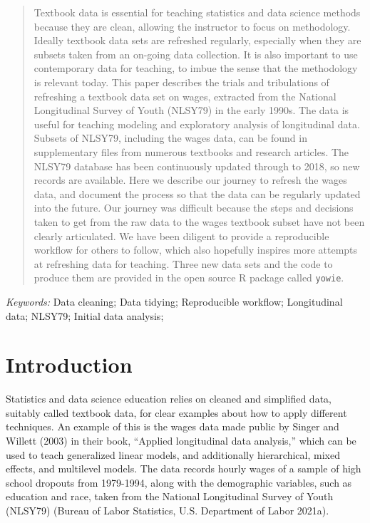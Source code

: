 \documentclass[12pt]{article}
\def\spacingset#1{\renewcommand{\baselinestretch}%
{#1}\small\normalsize} \spacingset{1}
\begin{document}
\bigskip
\begin{abstract}
Textbook data is essential for teaching statistics and data science methods because they are clean, allowing the instructor to focus on methodology. Ideally textbook data sets are refreshed regularly, especially when they are subsets taken from an on-going data collection. It is also important to use contemporary data for teaching, to imbue the sense that the methodology is relevant today. This paper describes the trials and tribulations of refreshing a textbook data set on wages, extracted from the National Longitudinal Survey of Youth (NLSY79) in the early 1990s. The data is useful for teaching modeling and exploratory analysis of longitudinal data. Subsets of NLSY79, including the wages data, can be found in supplementary files from numerous textbooks and research articles. The NLSY79 database has been continuously updated through to 2018, so new records are available. Here we describe our journey to refresh the wages data, and document the process so that the data can be regularly updated into the future. Our journey was difficult because the steps and decisions taken to get from the raw data to the wages textbook subset have not been clearly articulated. We have been diligent to provide a reproducible workflow for others to follow, which also hopefully inspires more attempts at refreshing data for teaching. Three new data sets and the code to produce them are provided in the open source R package called \texttt{yowie}.
\end{abstract}

\noindent%
{\it Keywords:}  Data cleaning; Data tidying; Reproducible workflow; Longitudinal data; NLSY79; Initial data analysis;
\vfill

\newpage
\spacingset{1.45} %

\hypertarget{intro}{%
\section{Introduction}\label{intro}}

Statistics and data science education relies on cleaned and simplified data, suitably called textbook data, for clear examples about how to apply different techniques. An example of this is the wages data made public by Singer and Willett (2003) in their book, ``Applied longitudinal data analysis,'' which can be used to teach generalized linear models, and additionally hierarchical, mixed effects, and multilevel models. The data records hourly wages of a sample of high school dropouts from 1979-1994, along with the demographic variables, such as education and race, taken from the National Longitudinal Survey of Youth (NLSY79) (Bureau of Labor Statistics, U.S. Department of Labor 2021a).
\end{document}
